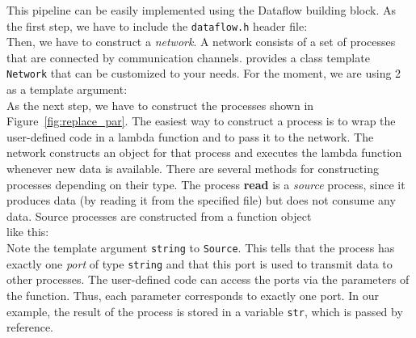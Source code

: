 This pipeline can be easily implemented using the Dataflow building block. As the first step, we have to include the \lstinline|dataflow.h| header file:
%
\\
%
Then, we have to construct a \emph{network}. A network consists of a set of processes that are connected by communication channels.
\embb provides a class template \lstinline|Network| that can be customized to your needs. For the moment, we are using 2 as a template argument:
%
\\
%
As the next step, we have to construct the processes shown in Figure~\ref{fig:replace_par}. The easiest way to construct a process is to wrap the user-defined code in a lambda function and to pass it to the network. The network constructs an object for that process and executes the lambda function whenever new data is available. There are several methods for constructing processes depending on their type. The process \textbf{read} is a \emph{source} process, since it produces data (by reading it from the specified file) but does not consume any data. Source processes are constructed from a function object
%
\\
%
like this:
%
\\
%
Note the template argument \lstinline|string| to \lstinline|Source|. This tells \embb that the process has exactly one \emph{port} of type \lstinline|string| and that this port is used to transmit data to other processes. The user-defined code can access the ports via the parameters of the function. Thus, each parameter corresponds to exactly one port. In our example, the result of the process is stored in a variable \lstinline|str|, which is passed by reference.


